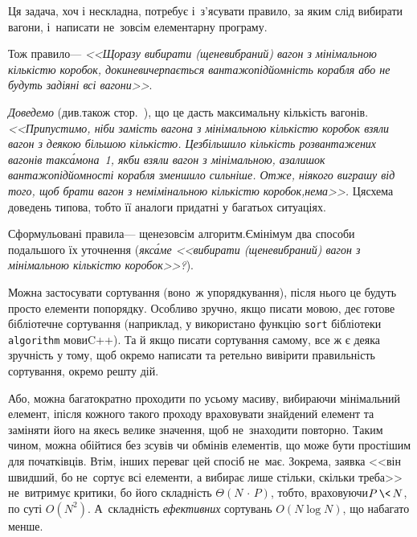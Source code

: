 \Tutorial	Ця задача, хоч і нескладна, потребує і~з'ясувати правило, за яким слід вибирати вагони, і~написати не~зовсім елементарну програму. 

Тож правило\nolinebreak[3] --- \textsl{<<Щоразу вибирати (ще\nolinebreak[3] не\nolinebreak[3] вибраний) вагон з мінімальною кількістю коробок, доки\nolinebreak[3] не\nolinebreak[3] вичерпається вантажопідйомність корабля або не будуть задіяні всі вагони>>}.

\label{text:proof-example-train-to-ship} %
\emph{Доведемо} (див.\nolinebreak[2] також стор.~\pageref{text:need-or-no-need-to-prove}), що це дасть максимальну кількість вагонів.
\textsl{<<Припустимо, ніби замість вагона з мінімальною кількістю коробок взяли вагон з деякою більшою кількістю. Це\nolinebreak[3] збільшило кількість розвантажених вагонів так\nolinebreak[3] с\'{а}мо\nolinebreak[1] на~1, якби взяли вагон з мінімальною, а\nolinebreak[3] залишок вантажо\-підйом\-ності корабля зменшило сильніше. Отже, ніякого виграшу від того, щоб брати вагон з немімінальною кількістю коробок,\nolinebreak[1] \mbox{нема}>>.} 
Ця\nolinebreak[2] схема доведень типова, тобто її аналоги придатні у багатьох ситуаціях.


Сформульовані правила\nolinebreak[3] --- ще\nolinebreak[2] не\nolinebreak[3] зовсім алгоритм.\linebreak[1] Є\nolinebreak[3] мінімум два способи подальшого їх уточнення (\emph{як\nolinebreak[3] с\'{а}ме \textsl{<<вибирати (ще\nolinebreak[3] не\nolinebreak[3] вибраний) вагон з мінімальною кількістю коробок>>}?}).

Можна застосувати сортування (воно~ж упорядкування), після нього це будуть просто елементи  по\nolinebreak[3] порядку. Особливо зручно, якщо писати мовою, де\nolinebreak[2] є готове бібліотечне сортування (наприклад, у\nolinebreak[2]  використано функцію \verb"sort" бібліотеки \verb"algorithm" мови\nolinebreak[3] C++). Та й якщо писати сортування самому, все ж є деяка зручність у тому, щоб окремо написати та ретельно вивірити правильність сортування, окремо решту дій.

Або, можна багатократно проходити по усьому масиву, вибираючи мінімальний елемент, і\nolinebreak[3] після кожного такого проходу враховувати знайдений елемент та заміняти його на якесь велике значення, щоб не~знаходити повторно. 
Таким чином, можна обійтися без зсувів чи обмінів елементів, що може бути простішим для початківців.
Втім, інших переваг цей спосіб не~має. Зокрема, заявка <<він швидший, бо не~сортує всі елементи, а вибирає лише стільки, скільки треба>> не~витримує критики, бо його складність ${\Theta(N\,{\cdot}\,P)}$, тобто, враховуючи\nolinebreak[3] ${P\,{\<}\,N}$, 
\ifAfour
по суті 
\fi
$O(N^2)$. А~складність \emph{ефективних} сортувань $O(N\log{}N)$, що набагато менше.
